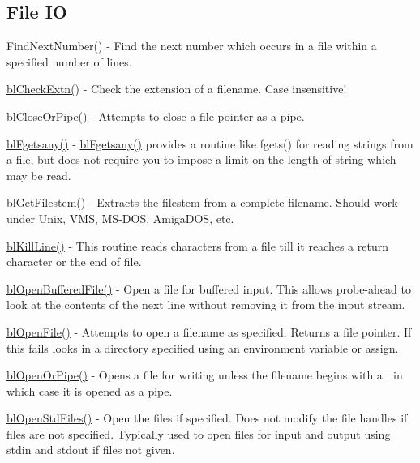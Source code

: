 \subsection*{File I\-O }


\begin{DoxyItemize}
\item Find\-Next\-Number() -\/ Find the next number which occurs in a file within a specified number of lines.
\item \hyperlink{_check_extn_8c_a7f77cdab603f1f33435df9e1584d701a}{bl\-Check\-Extn()} -\/ Check the extension of a filename. Case insensitive!
\item \hyperlink{general_8h_a1273c967c46a56b7ba0b928b421aff40}{bl\-Close\-Or\-Pipe()} -\/ Attempts to close a file pointer as a pipe.
\item \hyperlink{fgetsany_8c_a63b80964ef28655814582cad09dbc69a}{bl\-Fgetsany()} -\/ \hyperlink{fgetsany_8c_a63b80964ef28655814582cad09dbc69a}{bl\-Fgetsany()} provides a routine like fgets() for reading strings from a file, but does not require you to impose a limit on the length of string which may be read.
\item \hyperlink{general_8h_ae5fb53bf91cc5152904110964f053262}{bl\-Get\-Filestem()} -\/ Extracts the filestem from a complete filename. Should work under Unix, V\-M\-S, M\-S-\/\-D\-O\-S, Amiga\-D\-O\-S, etc.
\item \hyperlink{general_8h_a6cfc94e83ff4825e293a29ade5317d88}{bl\-Kill\-Line()} -\/ This routine reads characters from a file till it reaches a return character or the end of file.
\item \hyperlink{_buff_inp_8c_a9ec25032825fb56fe71a253208df0823}{bl\-Open\-Buffered\-File()} -\/ Open a file for buffered input. This allows probe-\/ahead to look at the contents of the next line without removing it from the input stream.
\item \hyperlink{general_8h_a1d4ddefb8433489fe4d855938943c4b7}{bl\-Open\-File()} -\/ Attempts to open a filename as specified. Returns a file pointer. If this fails looks in a directory specified using an environment variable or assign.
\item \hyperlink{general_8h_ac89a4227e0a95ce3865e21fa60b66ca3}{bl\-Open\-Or\-Pipe()} -\/ Opens a file for writing unless the filename begins with a $|$ in which case it is opened as a pipe.
\item \hyperlink{general_8h_a1f4aab78fc238d3315311d816e756592}{bl\-Open\-Std\-Files()} -\/ Open the files if specified. Does not modify the file handles if files are not specified. Typically used to open files for input and output using stdin and stdout if files not given.

\end{DoxyItemize}
